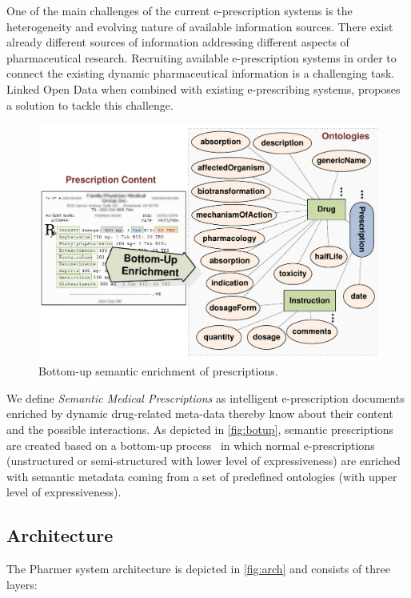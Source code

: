 \documentclass[journal]{IEEEtran}
\begin{document}
One of the main challenges of the current e-prescription systems is the heterogeneity and evolving nature of available information sources.
There exist already different sources of information addressing different aspects of pharmaceutical research.
Recruiting available e-prescription systems in order to connect the existing dynamic pharmaceutical information is a challenging task.
Linked Open Data when combined with existing e-prescribing systems, proposes a solution to tackle this challenge.

\begin{figure}[tb]
	\centering
		\includegraphics[width=1.0\columnwidth]{images/approaches.pdf}
	\caption{Bottom-up semantic enrichment of prescriptions.}
	\label{fig:botup}
\end{figure}

We define \emph{Semantic Medical Prescriptions} as intelligent e-prescription documents enriched by dynamic drug-related meta-data thereby know about their content and the possible interactions.
As depicted in \autoref{fig:botup}, semantic prescriptions are created based on a bottom-up process~\cite{khalili2012} in which normal e-prescriptions (unstructured or semi-structured with lower level of expressiveness) are enriched with semantic metadata coming from a set of predefined ontologies (with upper level of expressiveness).

\subsection{Architecture}

The Pharmer system architecture is depicted in \autoref{fig:arch} and consists of three layers:
\end{document}
